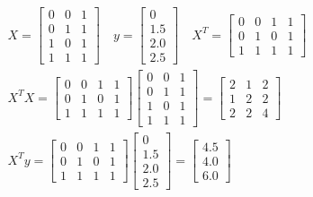 \documentclass[12pt]{article}
\begin{document}
\begin{gather}
    X =
    \begin{bmatrix}
        0 & 0 & 1 \\
        0 & 1 & 1 \\
        1 & 0 & 1 \\
        1 & 1 & 1 
    \end{bmatrix} 
    \quad 
    y = 
    \begin{bmatrix}
        0 \\
        1.5 \\
        2.0 \\
        2.5
    \end{bmatrix}
    \quad
    X^T =
    \begin{bmatrix}
        0 & 0 & 1 & 1 \\
        0 & 1 & 0 & 1  \\
        1 & 1 & 1 & 1 
    \end{bmatrix} \\
    X^T X = 
    \begin{bmatrix}
        0 & 0 & 1 & 1 \\
        0 & 1 & 0 & 1  \\
        1 & 1 & 1 & 1 
    \end{bmatrix}
    \begin{bmatrix}
        0 & 0 & 1 \\
        0 & 1 & 1 \\
        1 & 0 & 1 \\
        1 & 1 & 1 
    \end{bmatrix} 
    = 
    \begin{bmatrix}
    2 & 1 & 2 \\
    1 & 2 & 2 \\
    2 & 2 & 4
    \end{bmatrix}\\
    X^T y =
    \begin{bmatrix}
        0 & 0 & 1 & 1 \\
        0 & 1 & 0 & 1  \\
        1 & 1 & 1 & 1 
    \end{bmatrix}
    \begin{bmatrix}
        0 \\
        1.5 \\
        2.0 \\
        2.5
    \end{bmatrix}
    =
    \begin{bmatrix}
        4.5 \\
        4.0 \\
        6.0
    \end{bmatrix}
\end{gather}
\end{document}
